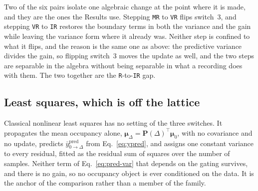 \begin{appendixbox}
Two of the six pairs isolate one algebraic change at the point where it is made, and they are
the ones the Results use. Stepping \texttt{MR} to \texttt{VR} flips switch~3, and stepping
\texttt{VR} to \texttt{IR} restores the boundary terms in both the variance and the gain
while leaving the variance form where it already was. Neither step is confined to what it
flips, and the reason is the same one as above: the predictive variance divides the gain, so
flipping switch~3 moves the update as well, and the two steps are separable in the algebra
without being separable in what a recording does with them. The two together are the
\texttt{R}-to-\texttt{IR} gap.

\subsection*{Least squares, which is off the lattice}

Classical nonlinear least squares has no setting of the three switches. It propagates the
mean occupancy alone, $\bm{\mu}_\Delta = \mathbf{P}(\Delta)^\top\bm{\mu}_0$, with no
covariance and no update, predicts $\bar{y}^{\mathrm{pred}}_{0\to\Delta}$ from Eq.~\ref{eq:ypred}, and
assigns one constant variance to every residual, fitted as the residual sum of squares over
the number of samples. Neither term of Eq.~\ref{eq:pred-var} that depends on the gating
survives, and there is no gain, so no occupancy object is ever conditioned on the data. It
is the anchor of the comparison rather than a member of the family.

\end{appendixbox}
